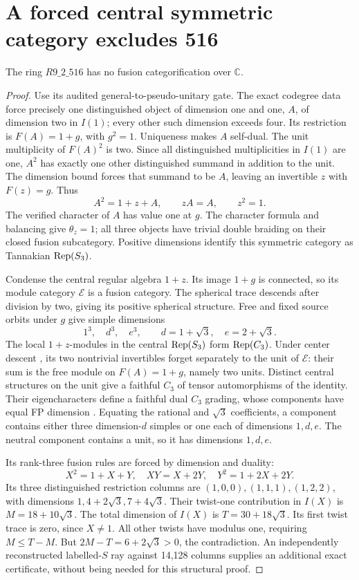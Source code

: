 \documentclass[11pt,a4paper]{article}
\theoremstyle{remark}\newtheorem{remark}[theorem]{Remark}
\newcommand{\C}{\mathbb C}\newcommand{\Q}{\mathbb Q}\newcommand{\Z}{\mathbb Z}
\begin{document}
\section{A forced central symmetric category excludes 516}
\begin{proposition}
The ring $R9\_2\_516$ has no fusion categorification over $\C$.
\end{proposition}
\begin{proof}
Use its audited general-to-pseudo-unitary gate. The exact codegree data
force precisely one distinguished object of dimension one and one, $A$,
of dimension two in $I(1)$; every other such dimension exceeds four.
Its restriction is $F(A)=1+g$, with $g^2=1$. Uniqueness makes $A$ self-dual.
The unit multiplicity of $F(A)^2$ is two. Since all distinguished
multiplicities in $I(1)$ are one, $A^2$ has exactly one other distinguished
summand in addition to the unit. The dimension bound forces that summand
to be $A$, leaving an invertible $z$ with $F(z)=g$. Thus
\[
 A^2=1+z+A,\qquad zA=A,\qquad z^2=1.
\]
The verified character of $A$ has value one at $g$. The character formula
and balancing give $\theta_z=1$; all three objects have trivial double
braiding on their closed fusion subcategory. Positive dimensions identify
this symmetric category as Tannakian $\operatorname{Rep}(S_3)$.

Condense the central regular algebra $1+z$. Its image $1+g$ is connected,
so its module category $\mathcal E$ is a fusion category. The spherical
trace descends after division by two, giving its positive spherical
structure. Free and fixed source orbits under $g$ give simple dimensions
\[
 1^3,\quad d^3,\quad e^3,\qquad d=1+\sqrt3,\quad e=2+\sqrt3.
\]
The local $1+z$-modules in the central $\operatorname{Rep}(S_3)$ form $\operatorname{Rep}(C_3)$.
Under center descent \cite[Theorem 3.20]{DMNO}, its two nontrivial
invertibles forget separately to the unit of $\mathcal E$: their sum is
the free module on $F(A)=1+g$, namely two units. Distinct central structures
on the unit give a faithful $C_3$ of tensor automorphisms of the identity.
Their eigencharacters define a faithful dual $C_3$ grading, whose components
have equal FP dimension \cite{ENO}. Equating the rational and $\sqrt3$
coefficients, a component contains either three dimension-$d$ simples or
one each of dimensions $1,d,e$. The neutral component contains a unit,
so it has dimensions $1,d,e$.

Its rank-three fusion rules are forced by dimension and duality:
\[
 X^2=1+X+Y,\quad XY=X+2Y,\quad Y^2=1+2X+2Y.
\]
Its three distinguished restriction columns are $(1,0,0),(1,1,1),(1,2,2)$,
with dimensions $1,4+2\sqrt3,7+4\sqrt3$. Their twist-one contribution
in $I(X)$ is $M=18+10\sqrt3$. The total dimension of $I(X)$ is
$T=30+18\sqrt3$. Its first twist trace is zero, since $X\ne1$.
All other twists have modulus one, requiring $M\leq T-M$. But
$2M-T=6+2\sqrt3>0$, the contradiction.
An independently reconstructed labelled-$S$ ray against 14,128 columns
supplies an additional exact certificate, without being needed for this
structural proof.
\end{proof}
\end{document}
